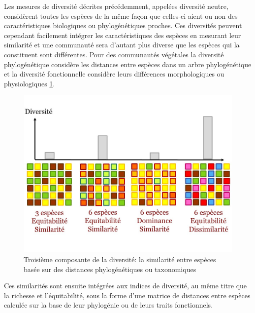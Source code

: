 \documentclass[11pt,french,A4paper,extrafontsizes,onecolumn,openright]{memoir}
\begin{document}
Les mesures de diversité décrites précédemment, appelées diversité
neutre, considèrent toutes les espèces de la même façon que celles-ci
aient ou non des caractéristiques biologiques ou phylogénétiques
proches. Ces diversités peuvent cependant facilement intégrer les
caractéristiques des espèces en mesurant leur similarité et une
communauté sera d'autant plus diverse que les espèces qui la constituent
sont différentes. Pour des communautés végétales la diversité
phylogénétique considère les distances entre espèces dans un arbre
phylogénétique et la diversité fonctionnelle considère leurs différences
morphologiques ou physiologiques \ref{fig:RichEquSim}.

\begin{figure}

{\centering \includegraphics[width=0.6\linewidth]{ExternalFig/Fig_RichnessEquitabilitySimilarity} 

}

\caption{Troisième composante de la diversité: la similarité entre espèces basée sur des distances phylogénétiques ou taxonomiques}\label{fig:RichEquSim}
\end{figure}

Ces similarités sont ensuite intégrées aux indices de diversité, au même
titre que la richesse et l'équitabilité, sous la forme d'une matrice de
distances entre espèces calculée sur la base de leur phylogénie ou de
leurs traits fonctionnels.
\end{document}
